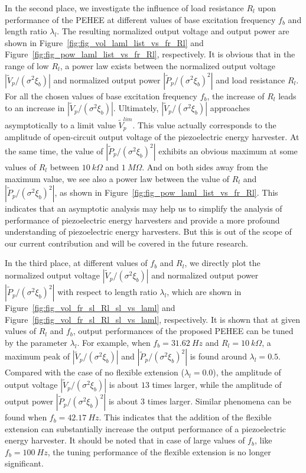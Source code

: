 \documentclass{elsarticle}
\begin{document}
In the second place, we investigate the influence of load resistance $R_l$ upon performance of the PEHEE at different values of base excitation frequency $f_b$ and length ratio $\lambda_l$. The resulting normalized output voltage and output power are shown in Figure~\ref{fig:fig_vol_laml_list_vs_fr_Rl} and Figure~\ref{fig:fig_pow_laml_list_vs_fr_Rl}, respectively. It is obvious that in the range of low $R_l$, a power law exists between the normalized output voltage $|\tilde{V}_p/(\sigma^2 \xi_b)|$ and normalized output power $|\tilde{P}_p/(\sigma^2 \xi_b)^2|$ and load resistance $R_l$. For all the chosen values of base excitation frequency $f_b$, the increase of $R_l$ leads to an increase in $|\tilde{V}_p/(\sigma^2 \xi_b)|$. Ultimately, $|\tilde{V}_p/(\sigma^2 \xi_b)|$ approaches asymptotically to a limit value $\tilde{V}_p^{lim}$. This value actually corresponds to the amplitude of open-circuit output voltage of the piezoelectric energy harvester. At the same time, the value of $|\tilde{P}_p/(\sigma^2 \xi_b)^2|$ exhibits an obvious maximum at some values of $R_l$ between $10\ k\Omega$ and $1\ M\Omega$. And on both sides away from the maximum value, we see also a power law between the value of $R_l$ and $|\tilde{P}_p/(\sigma^2 \xi_b)^2|$, as shown in Figure~\ref{fig:fig_pow_laml_list_vs_fr_Rl}. This indicates that an asymptotic analysis may help us to simplify the analysis of performance of piezoelectric energy harvesters and provide a more profound understanding of piezoelectric energy harvesters. But this is out of the scope of our current contribution and will be covered in the future research.


In the third place, at different values of $f_b$ and $R_l$, we directly plot the normalized output voltage $|\tilde{V}_p/(\sigma^2 \xi_b)|$ and normalized output power $|\tilde{P}_p/(\sigma^2 \xi_b)^2|$ with respect to length ratio $\lambda_l$, which are shown in Figure~\ref{fig:fig_vol_fr_sl_Rl_sl_vs_laml} and Figure~\ref{fig:fig_vol_fr_sl_Rl_sl_vs_laml}, respectively. It is shown that at given values of $R_l$ and $f_b$, output performances of the proposed PEHEE can be tuned by the parameter $\lambda_l$. For example, when $f_b = 31.62\ Hz$ and $R_l = 10\ k\Omega$, a maximum peak of $|\tilde{V}_p/(\sigma^2 \xi_b)|$ and $|\tilde{P}_p/(\sigma^2 \xi_b)^2|$ is found around $\lambda_l = 0.5$. Compared with the case of no flexible extension ($\lambda_l = 0.0$), the amplitude of output voltage $|\tilde{V}_p/(\sigma^2 \xi_b)|$ is about $13$ times larger, while the amplitude of output power $|\tilde{P}_p/(\sigma^2 \xi_b)^2|$ is about $3$ times larger. Similar phenomena can be found when $f_b = 42.17\ Hz$. This indicates that the addition of the flexible extension can substantially increase the output performance of a piezoelectric energy harvester. It should be noted that in case of large values of $f_b$, like $f_b = 100\ Hz$, the tuning performance of the flexible extension is no longer significant.
\end{document}
